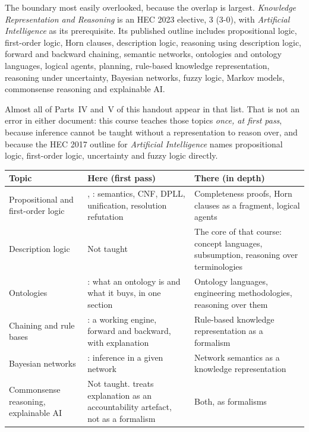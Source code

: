 The boundary most easily overlooked, because the overlap is largest.
\emph{Knowledge Representation and Reasoning} is an HEC 2023 elective, 3 (3-0),
with \emph{Artificial Intelligence} as its prerequisite. Its published outline
includes propositional logic, first-order logic, Horn clauses, description logic,
reasoning using description logic, forward and backward chaining, semantic
networks, ontologies and ontology languages, logical agents, planning, rule-based
knowledge representation, reasoning under uncertainty, Bayesian networks, fuzzy
logic, Markov models, commonsense reasoning and explainable AI.

Almost all of Parts~IV and~V of this handout appear in that list. That is not an
error in either document: this course teaches those topics \emph{once, at first
pass}, because inference cannot be taught without a representation to reason over,
and because the HEC 2017 outline for \emph{Artificial Intelligence} names
propositional logic, first-order logic, uncertainty and fuzzy logic directly.

\begin{longtable}{@{}L{4.6cm}L{4.6cm}L{5.4cm}@{}}
\toprule
{}
\textbf{Topic} & \textbf{Here (first pass)} & \textbf{There (in depth)} \\
\midrule
\endhead
Propositional and first-order logic & ,
: semantics, CNF, DPLL, unification, resolution refutation &
Completeness proofs, Horn clauses as a fragment, logical agents \\
Description logic & Not taught & The core of that course: concept languages,
subsumption, reasoning over terminologies \\
Ontologies & : what an ontology is and what it buys, in one section &
Ontology languages, engineering methodologies, reasoning over them \\
Chaining and rule bases & : a working engine, forward and backward,
with explanation & Rule-based knowledge representation as a formalism \\
Bayesian networks & : inference in a given network & Network
semantics as a knowledge representation \\
Commonsense reasoning, explainable AI & Not taught.  treats
explanation as an accountability artefact, not as a formalism & Both, as
formalisms \\
\bottomrule
\end{longtable}

